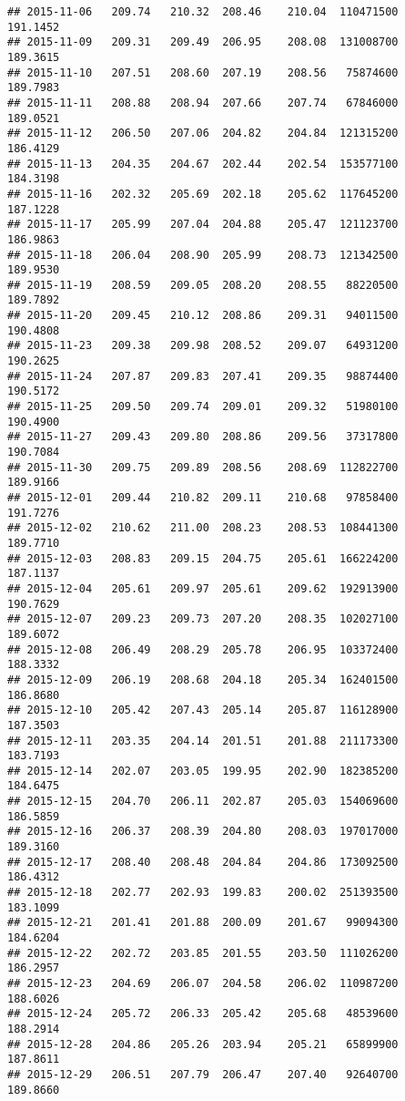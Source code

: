\documentclass[
]{article}
\begin{document}
\begin{verbatim}
## 2015-11-06   209.74   210.32  208.46    210.04  110471500     191.1452
## 2015-11-09   209.31   209.49  206.95    208.08  131008700     189.3615
## 2015-11-10   207.51   208.60  207.19    208.56   75874600     189.7983
## 2015-11-11   208.88   208.94  207.66    207.74   67846000     189.0521
## 2015-11-12   206.50   207.06  204.82    204.84  121315200     186.4129
## 2015-11-13   204.35   204.67  202.44    202.54  153577100     184.3198
## 2015-11-16   202.32   205.69  202.18    205.62  117645200     187.1228
## 2015-11-17   205.99   207.04  204.88    205.47  121123700     186.9863
## 2015-11-18   206.04   208.90  205.99    208.73  121342500     189.9530
## 2015-11-19   208.59   209.05  208.20    208.55   88220500     189.7892
## 2015-11-20   209.45   210.12  208.86    209.31   94011500     190.4808
## 2015-11-23   209.38   209.98  208.52    209.07   64931200     190.2625
## 2015-11-24   207.87   209.83  207.41    209.35   98874400     190.5172
## 2015-11-25   209.50   209.74  209.01    209.32   51980100     190.4900
## 2015-11-27   209.43   209.80  208.86    209.56   37317800     190.7084
## 2015-11-30   209.75   209.89  208.56    208.69  112822700     189.9166
## 2015-12-01   209.44   210.82  209.11    210.68   97858400     191.7276
## 2015-12-02   210.62   211.00  208.23    208.53  108441300     189.7710
## 2015-12-03   208.83   209.15  204.75    205.61  166224200     187.1137
## 2015-12-04   205.61   209.97  205.61    209.62  192913900     190.7629
## 2015-12-07   209.23   209.73  207.20    208.35  102027100     189.6072
## 2015-12-08   206.49   208.29  205.78    206.95  103372400     188.3332
## 2015-12-09   206.19   208.68  204.18    205.34  162401500     186.8680
## 2015-12-10   205.42   207.43  205.14    205.87  116128900     187.3503
## 2015-12-11   203.35   204.14  201.51    201.88  211173300     183.7193
## 2015-12-14   202.07   203.05  199.95    202.90  182385200     184.6475
## 2015-12-15   204.70   206.11  202.87    205.03  154069600     186.5859
## 2015-12-16   206.37   208.39  204.80    208.03  197017000     189.3160
## 2015-12-17   208.40   208.48  204.84    204.86  173092500     186.4312
## 2015-12-18   202.77   202.93  199.83    200.02  251393500     183.1099
## 2015-12-21   201.41   201.88  200.09    201.67   99094300     184.6204
## 2015-12-22   202.72   203.85  201.55    203.50  111026200     186.2957
## 2015-12-23   204.69   206.07  204.58    206.02  110987200     188.6026
## 2015-12-24   205.72   206.33  205.42    205.68   48539600     188.2914
## 2015-12-28   204.86   205.26  203.94    205.21   65899900     187.8611
## 2015-12-29   206.51   207.79  206.47    207.40   92640700     189.8660

\end{verbatim}
\end{document}
